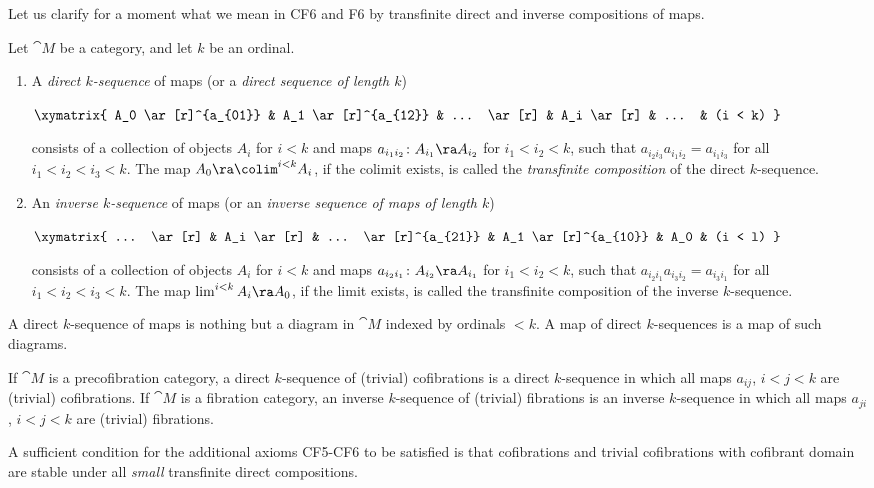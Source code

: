 Let us clarify for a moment what we mean in CF6 and F6 by transfinite direct and inverse compositions of maps.
\begin{defn}
\label{defn:transcomp}
Let ${\cat M}$ be a category, and let $k$ be an ordinal. 
\begin{enumerate}
\item
A {\it direct $k$-sequence} of maps (or a {\it direct sequence of length $k$})
\begin{center}
$ \xymatrix {
        A_0 \ar[r]^{a_{01}} &
        A_1 \ar[r]^{a_{12}} &
	... \ar[r] &
        A_i \ar[r] &
        ... &
        (i < k)
	}$
\end{center}
consists of a collection of objects $A_i$ for $i < k$ and maps $a_{i_1i_2} \colon A_{i_1} \ra A_{i_2}$ for $i_1 < i_2 < k$, such that $a_{i_2i_3}a_{i_1i_2} = a_{i_1i_3}$ for all $i_1 < i_2 < i_3 < k$. The map $A_0 \ra \colim^{i < k} A_i$, if the colimit exists, is called the {\it transfinite composition} of the direct $k$-sequence. 
\item
An {\it inverse $k$-sequence} of maps (or an {\it inverse sequence of maps of length $k$})
\begin{center}
$ \xymatrix {
    ... \ar[r] &
    A_i \ar[r] &
    ... \ar[r]^{a_{21}} &
    A_1 \ar[r]^{a_{10}} &
    A_0 &
    (i < l)
  }$
\end{center}
consists of a collection of objects $A_i$  for $i < k$ and maps $a_{i_2i_1} \colon A_{i_2} \ra A_{i_1}$ for $i_1 < i_2 < k$, such that $a_{i_2i_1}a_{i_3i_2} = a_{i_3i_1}$ for all $i_1 < i_2 < i_3 < k$. The map $\lim^{i < k} A_i \ra A_0$, if the limit exists, is called the transfinite composition of the inverse $k$-sequence.
\end{enumerate}
\end{defn}

A direct $k$-sequence of maps is nothing but a diagram in ${\cat M}$ indexed by ordinals $< k$. A map of direct $k$-sequences is a map of such diagrams. 
 
If ${\cat M}$ is a precofibration category, a direct $k$-sequence of (trivial) cofibrations is a direct $k$-sequence in which all maps $a_{ij}$, $i < j < k$ are (trivial) cofibrations.  If ${\cat M}$ is a fibration category, an inverse $k$-sequence of (trivial) fibrations is an inverse $k$-sequence in which all maps $a_{ji}$, $i < j < k$ are (trivial) fibrations.

A sufficient condition for the additional axioms CF5-CF6 to be satisfied is that cofibrations and trivial cofibrations with cofibrant domain are stable under all {\it small} transfinite direct compositions.

